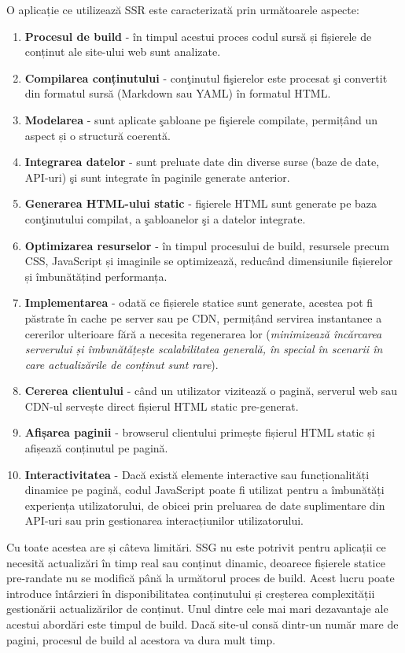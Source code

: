 \documentclass[12pt, a4paper]{report}
\begin{document}
O aplicație ce utilizează SSR este caracterizat\u a prin următoarele aspecte:
\begin{enumerate}
	\item \textbf{Procesul de build} - \^in timpul acestui proces codul sursă și fișierele de conținut ale site-ului web sunt analizate.
	\item \textbf{Compilarea conținutului} - con\c tinutul fi\c sierelor este procesat \c si convertit din formatul sursă (Markdown sau YAML) în formatul HTML.
	\item \textbf{Modelarea} - sunt aplicate \c sabloane pe fi\c sierele compilate, permițând un aspect și o structură coerent\u a.
	\item \textbf{Integrarea datelor} - sunt preluate date din diverse surse (baze de date, API-uri) \c si sunt integrate în paginile generate anterior.
	\item \textbf{Generarea HTML-ului static} - fi\c sierele HTML sunt generate pe baza con\c tinutului compilat, a \c sabloanelor \c si a datelor integrate.
	\item \textbf{Optimizarea resurselor} - \^in timpul procesului de build, resursele precum CSS, JavaScript și imaginile se optimizeaz\u a, reducând dimensiunile fișierelor și îmbunătățind performanța.
	\item \textbf{Implementarea} -  odată ce fișierele statice sunt generate, acestea pot fi păstrate în cache pe server sau pe CDN, permițând servirea instantanee a cererilor ulterioare fără a necesita regenerarea lor (\textit{minimizează încărcarea serverului și îmbunătățește scalabilitatea generală, în special în scenarii în care actualizările de conținut sunt rare}).
	\item \textbf{Cererea clientului} -  când un utilizator vizitează o pagină, serverul web sau CDN-ul servește direct fișierul HTML static pre-generat.
	\item \textbf{Afișarea paginii} - browserul clientului primește fișierul HTML static și afișează conținutul pe pagină.
	\item \textbf{Interactivitatea} - Dacă există elemente interactive sau funcționalități dinamice pe pagină, codul JavaScript poate fi utilizat pentru a îmbunătăți experiența utilizatorului, de obicei prin preluarea de date suplimentare din API-uri sau prin gestionarea interacțiunilor utilizatorului.
\end{enumerate}

Cu toate acestea are și câteva limitări. SSG nu este potrivit pentru aplicații ce necesită actualizări în timp real sau conținut dinamic, deoarece fișierele statice pre-randate nu se modifică până la următorul proces de build. Acest lucru poate introduce întârzieri în disponibilitatea conținutului și creșterea complexității gestionării actualizărilor de conținut.
Unul dintre cele mai mari dezavantaje ale acestui abordări este timpul de build. Dacă site-ul cons\u a dintr-un num\u ar mare de pagini, procesul de build al acestora va dura mult timp.
\end{document}
